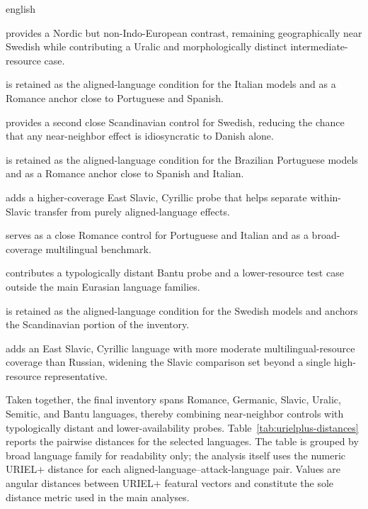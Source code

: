 \begin{otherlanguage*}{english}
\begin{description}[style=multiline,leftmargin=2.2cm,labelwidth=1.6cm,font=\normalfont\ttfamily]
\item[fin] provides a Nordic but non-Indo-European contrast, remaining geographically near Swedish while contributing a Uralic and morphologically distinct intermediate-resource case.

\item[ita] is retained as the aligned-language condition for the Italian models and as a Romance anchor close to Portuguese and Spanish.

\item[nor] provides a second close Scandinavian control for Swedish, reducing the chance that any near-neighbor effect is idiosyncratic to Danish alone.

\item[por] is retained as the aligned-language condition for the Brazilian Portuguese models and as a Romance anchor close to Spanish and Italian.

\item[rus] adds a higher-coverage East Slavic, Cyrillic probe that helps separate within-Slavic transfer from purely aligned-language effects.

\item[spa] serves as a close Romance control for Portuguese and Italian and as a broad-coverage multilingual benchmark.

\item[swa] contributes a typologically distant Bantu probe and a lower-resource test case outside the main Eurasian language families.

\item[swe] is retained as the aligned-language condition for the Swedish models and anchors the Scandinavian portion of the inventory.

\item[ukr] adds an East Slavic, Cyrillic language with more moderate multilingual-resource coverage than Russian, widening the Slavic comparison set beyond a single high-resource representative.

\end{description}

Taken together, the final inventory spans Romance, Germanic, Slavic, Uralic, Semitic, and Bantu languages, thereby combining near-neighbor controls with typologically distant and lower-availability probes. Table~\ref{tab:urielplus-distances} reports the pairwise distances for the selected languages. The table is grouped by broad language family for readability only; the analysis itself uses the numeric URIEL+ distance for each aligned-language--attack-language pair. Values are angular distances between URIEL+ featural vectors and constitute the sole distance metric used in the main analyses.


\end{otherlanguage*}
